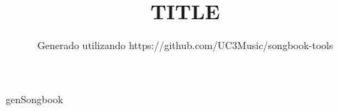 \documentclass[11pt,a4paper,openany]{book}  %
\begin{document}
\Large

\title{TITLE}
\author{Generado utilizando https://github.com/UC3Music/songbook-tools} 

\maketitle
\cleardoublepage
\tableofcontents
\newpage  %


genSongbook

\end{document}
